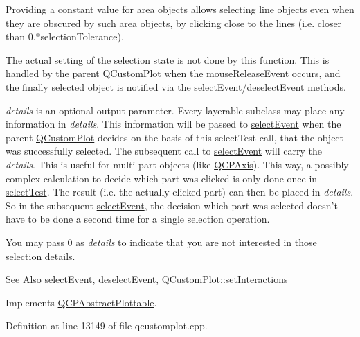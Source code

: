 Providing a constant value for area objects allows selecting line objects even when they are obscured by such area objects, by clicking close to the lines (i.\-e. closer than 0.$\ast$selection\-Tolerance).

The actual setting of the selection state is not done by this function. This is handled by the parent \hyperlink{class_q_custom_plot}{Q\-Custom\-Plot} when the mouse\-Release\-Event occurs, and the finally selected object is notified via the select\-Event/deselect\-Event methods.

{\itshape details} is an optional output parameter. Every layerable subclass may place any information in {\itshape details}. This information will be passed to \hyperlink{class_q_c_p_abstract_plottable_a16aaad02456aa23a759efd1ac90c79bf}{select\-Event} when the parent \hyperlink{class_q_custom_plot}{Q\-Custom\-Plot} decides on the basis of this select\-Test call, that the object was successfully selected. The subsequent call to \hyperlink{class_q_c_p_abstract_plottable_a16aaad02456aa23a759efd1ac90c79bf}{select\-Event} will carry the {\itshape details}. This is useful for multi-\/part objects (like \hyperlink{class_q_c_p_axis}{Q\-C\-P\-Axis}). This way, a possibly complex calculation to decide which part was clicked is only done once in \hyperlink{class_q_c_p_curve_a5af9949e725704811bbc81ecd5970b8e}{select\-Test}. The result (i.\-e. the actually clicked part) can then be placed in {\itshape details}. So in the subsequent \hyperlink{class_q_c_p_abstract_plottable_a16aaad02456aa23a759efd1ac90c79bf}{select\-Event}, the decision which part was selected doesn't have to be done a second time for a single selection operation.

You may pass 0 as {\itshape details} to indicate that you are not interested in those selection details.

\begin{DoxySeeAlso}{See Also}
\hyperlink{class_q_c_p_abstract_plottable_a16aaad02456aa23a759efd1ac90c79bf}{select\-Event}, \hyperlink{class_q_c_p_abstract_plottable_a6fa0d0f95560ea8b01ee13f296dab2b1}{deselect\-Event}, \hyperlink{class_q_custom_plot_a5ee1e2f6ae27419deca53e75907c27e5}{Q\-Custom\-Plot\-::set\-Interactions} 
\end{DoxySeeAlso}


Implements \hyperlink{class_q_c_p_abstract_plottable_a38efe9641d972992a3d44204bc80ec1d}{Q\-C\-P\-Abstract\-Plottable}.



Definition at line 13149 of file qcustomplot.\-cpp.

